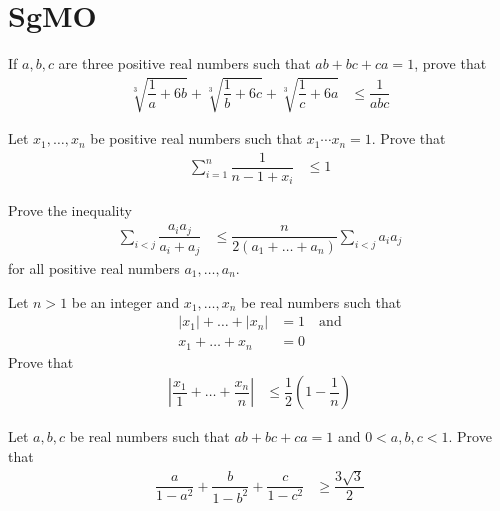 \documentclass{subfile}
\begin{document}
	
	\section{SgMO}\label{sec:sgmo}
	
		\begin{problem}
			If $a,b,c$ are three positive real numbers such that $ab+bc+ca=1$, prove that
				\begin{align*}
					\sqrt[3]{\dfrac{1}{a}+6b}+\sqrt[3]{\dfrac{1}{b}+6c}+\sqrt[3]{\dfrac{1}{c}+6a}
						& \leq\dfrac{1}{abc}
				\end{align*}
		\end{problem}
		
		\begin{problem}
			Let $x_{1},\ldots,x_{n}$ be positive real numbers such that $x_{1}\cdots x_{n}=1$. Prove that
				\begin{align*}
					\sum_{i=1}^{n}\dfrac{1}{n-1+x_{i}}
						& \leq1
				\end{align*}
		\end{problem}
		
		\begin{problem}
			Prove the inequality
				\begin{align*}
					\sum_{i<j}\dfrac{a_{i}a_{j}}{a_{i}+a_{j}}
						& \leq \dfrac{n}{2(a_{1}+\ldots+a_{n})}\sum_{i<j}a_{i}a_{j}
				\end{align*}
			for all positive real numbers $a_{1},\ldots,a_{n}$.
		\end{problem}
		
		\begin{problem}
			Let $n>1$ be an integer and $x_{1},\ldots,x_{n}$ be real numbers such that
				\begin{align*}
					|x_{1}|+\ldots+|x_{n}|
						& = 1\quad\mbox{and}\\
					x_{1}+\ldots+x_{n}
						& = 0
				\end{align*}
			Prove that
				\begin{align*}
					\left|\dfrac{x_{1}}{1}+\ldots+\dfrac{x_{n}}{n}\right|
						& \leq \dfrac{1}{2}\left(1-\dfrac{1}{n}\right)
				\end{align*}
		\end{problem}
		
		\begin{problem}
			Let $a,b,c$ be real numbers such that $ab+bc+ca=1$ and $0<a,b,c<1$. Prove that
				\begin{align*}
					\dfrac{a}{1-a^{2}}+\dfrac{b}{1-b^{2}}+\dfrac{c}{1-c^{2}}
						& \geq\dfrac{3\sqrt{3}}{2}
				\end{align*}
		\end{problem}
	
\end{document}

